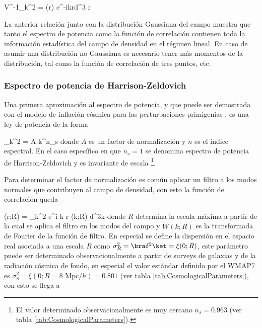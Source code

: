{ V^{-1}\sigma_k^2 = \int \xi(\bds r) e^{-i\bds k\cdot \bds r}d^3 \bds r }


La anterior relación junto con la distribución Gaussiana del campo muestra 
que tanto el espectro de potencia como la función de correlación contienen
toda la información estadística del campo de densidad en el régimen lineal.
En caso de asumir una distribución no-Gaussiana es necesario tener más
momentos de la distribución, tal como la función de correlación de tres 
puntos, etc.


			\subsubsection*{Espectro de potencia de Harrison-Zeldovich}
			

Una primera aproximación al espectro de potencia, y que puede ser 
demostrada con el modelo de inflación cósmica para las perturbaciones 
primigenias \cite{padmanabhan1995}, es una ley de potencia de la forma


{ \sigma_k^2 = A k^{n_s} }
donde $A$ es un factor de normalización y $n$ es el índice espectral. En 
el caso específico en que $n_s=1$ se denomina espectro de potencia de 
Harrison-Zeldovich y es invariante de escala \footnote{El valor determinado 
observacionalmente es muy cercano $n_s = 0.963$ (ver tabla
\ref{tab:CosmologicalParameters}).}.


Para determinar el factor de normalización es común aplicar un filtro a 
los modos normales que contribuyen al campo de densidad, con esto la 
función de correlación queda


{ \xi(\bds r;R) = \int {}\sigma_k^2 
e^{i \bds k \cdot \bds r} (k;R) d^3\bds k }
donde $R$ determina la escala máxima a partir de la cual se aplica el 
filtro en los modos del campo y $\tilde{W}(k;R)$ es la transformada de
Fourier de la función de filtro. En especial se define la dispersión en el
espacio real asociada a una escala $R$ como $\sigma^2_R = \bra \delta^2 \ket=
\xi(0; R)$, este parámetro puede ser determinado observacionalmente a partir
de surveys de galaxias y de la radiación cósmica de fondo, en especial el 
valor estándar definido por el WMAP7 es $\sigma^2_8 = \xi(0; R = 
8 \mbox{ Mpc}/h) = 0.801$ (ver tabla \ref{tab:CosmologicalParameters}), con
esto se llega a


